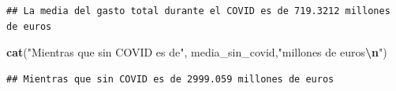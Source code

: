 \documentclass[data,article,submit,moreauthors,pdftex]{Definitions/mdpi}
\newenvironment{Shaded}{\begin{snugshade}}{\end{snugshade}}
\newcommand{\DecValTok}[1]{\textcolor[rgb]{0.00,0.00,0.81}{#1}}
\newcommand{\FunctionTok}[1]{\textcolor[rgb]{0.13,0.29,0.53}{\textbf{#1}}}
\newcommand{\NormalTok}[1]{#1}
\newcommand{\OtherTok}[1]{\textcolor[rgb]{0.56,0.35,0.01}{#1}}
\newcommand{\SpecialCharTok}[1]{\textcolor[rgb]{0.81,0.36,0.00}{\textbf{#1}}}
\newcommand{\StringTok}[1]{\textcolor[rgb]{0.31,0.60,0.02}{#1}}
\begin{document}
\begin{Shaded}
\end{Shaded}

\begin{verbatim}
## La media del gasto total durante el COVID es de 719.3212 millones de euros
\end{verbatim}

\begin{Shaded}
\begin{Highlighting}[]
\FunctionTok{cat}\NormalTok{(}\StringTok{"Mientras que sin COVID es de"}\NormalTok{, media\_sin\_covid,}\StringTok{"millones de euros}\SpecialCharTok{\textbackslash{}n}\StringTok{"}\NormalTok{)}
\end{Highlighting}
\end{Shaded}

\begin{verbatim}
## Mientras que sin COVID es de 2999.059 millones de euros
\end{verbatim}
\end{document}
